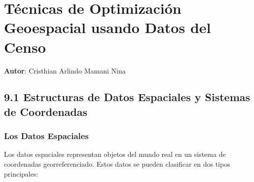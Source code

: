 \documentclass{article}
\begin{document}
	\chapter{Técnicas de Optimización Geoespacial usando Datos del Censo}
	\textbf{Autor}: \large{Cristhian Arlindo Mamani Nina}
	\label{chap:9}
	
	\vspace{1cm} 
	
\section*{9.1 Estructuras de Datos Espaciales y Sistemas de Coordenadas}

\subsection*{Los Datos Espaciales}
Los datos espaciales representan objetos del mundo real en un sistema de coordenadas georreferenciado. Estos datos se pueden clasificar en dos tipos principales:
\end{document}
